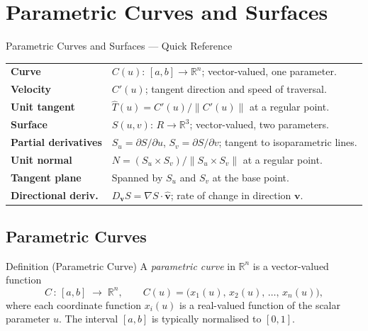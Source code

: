 
\section{Parametric Curves and Surfaces}

\begin{toolkitbox}{Parametric Curves and Surfaces --- Quick Reference}
\begin{tabular}{@{}p{}p{}@{}}
\textbf{Curve}               & $C(u):\,[a,b]\to\mathbb{R}^n$; vector-valued, one parameter. \\[4pt]
\textbf{Velocity}            & $C'(u)$; tangent direction and speed of traversal. \\[4pt]
\textbf{Unit tangent}        & $\hat{T}(u) = C'(u)/\|C'(u)\|$ at a regular point. \\[4pt]
\textbf{Surface}             & $S(u,v):\,R\to\mathbb{R}^3$; vector-valued, two parameters. \\[4pt]
\textbf{Partial derivatives} & $S_u = \partial S/\partial u$,\; $S_v = \partial S/\partial v$; tangent to isoparametric lines. \\[4pt]
\textbf{Unit normal}         & $N = (S_u\times S_v)/\|S_u\times S_v\|$ at a regular point. \\[4pt]
\textbf{Tangent plane}       & Spanned by $S_u$ and $S_v$ at the base point. \\[4pt]
\textbf{Directional deriv.}  & $D_{\mathbf{v}}S = \nabla S \cdot \hat{\mathbf{v}}$; rate of change in direction $\mathbf{v}$. \\
\end{tabular}
\end{toolkitbox}

\subsection*{Parametric Curves}

\begin{propositionbox}{Definition (Parametric Curve)}
A \emph{parametric curve} in $\mathbb{R}^n$ is a vector-valued function
\[
  C\,:\,[a,b]\;\to\;\mathbb{R}^n, \qquad
  C(u) = \bigl(x_1(u),\,x_2(u),\,\ldots,\,x_n(u)\bigr),
\]
where each coordinate function $x_i(u)$ is a real-valued function
of the scalar parameter $u$.
The interval $[a,b]$ is typically normalised to $[0,1]$.
\end{propositionbox}

